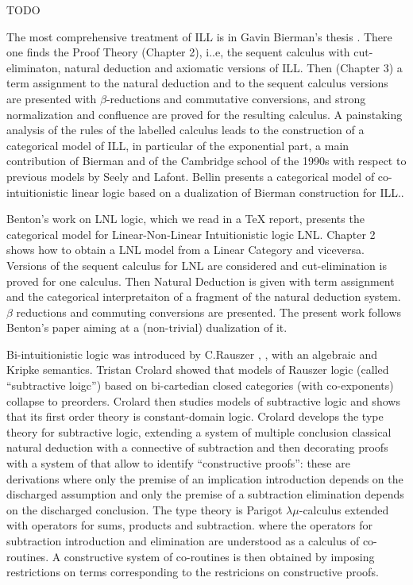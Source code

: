 TODO

The most comprehensive treatment of ILL is in Gavin Bierman's thesis  \cite{Bierman:1994}.
There one finds the Proof Theory (Chapter 2), i..e, the sequent calculus with cut-eliminaton, natural deduction and
axiomatic versions of ILL. Then (Chapter 3) a term assignment to the natural deduction and to the sequent calculus
versions are presented with $\beta$-reductions and commutative conversions, and strong normalization and confluence
are proved for the resulting calculus. A painstaking analysis of the rules of the labelled calculus leads to the construction
of a categorical model of ILL, in particular of the exponential part, a main contribution of Bierman and of the
Cambridge school of the 1990s with respect to previous models by Seely and Lafont.
Bellin \cite{Bellin:2014} presents a categorical model of co-intuitionistic linear logic based on a dualization of
Bierman \cite{Bierman:1994} construction for ILL..

Benton's work \cite{Benton:1994} on LNL logic, which we read in a TeX report, presents the categorical model 
for Linear-Non-Linear Intuitionistic logic LNL. Chapter 2 shows
how to obtain a LNL model from a Linear Category and viceversa. Versions of the sequent calculus for LNL
are considered  and cut-elimination is proved for one calculus. Then Natural Deduction is given with term
assignment and the categorical interpretaiton of a fragment of the natural deduction system. $\beta$ reductions
and commuting conversions are presented.
The present work follows Benton's paper aiming at a (non-trivial) dualization of it.

Bi-intuitionistic logic was introduced by C.Rauszer \cite{Rauszer:1974},  \cite{Rauszer:1974a}, \cite{Rauszer:1977} with
an algebraic and Kripke semantics.  Tristan Crolard \cite{Crolard:2001} showed that models of Rauszer logic (called
``subtractive loigc'') based on bi-cartedian closed categories (with co-exponents) collapse to preorders.
Crolard then studies models of subtractive logic and shows that its first order theory is constant-domain logic.
Crolard \cite{Crolard:2004} develops the type theory for subtractive logic, extending a system of multiple conclusion
classical natural deduction with a connective of subtraction and then decorating proofs with a system of \cite{annotations
of dependencies} that allow to identify ``constructive proofs'': these are derivations where only the premise of an implication
introduction depends on the discharged assumption and only the premise of a subtraction elimination depends on the
discharged conclusion. The type theory is Parigot $\lambda\mu$-calculus extended with operators for sums, products
and subtraction. where the operators for subtraction introduction and elimination are understood as a calculus of co-routines.
A constructive system of co-routines is then obtained by imposing restrictions on terms corresponding to the restricions
 on constructive proofs.

